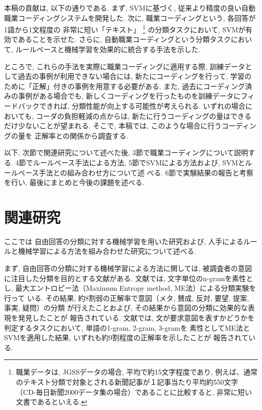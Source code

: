 \documentclass{nlp}
\begin{document}
本稿の貢献は, 以下の通りである. 
まず, 
SVMに基づく, 従来より精度の良い自動職業コーディングシステムを開発した. 
次に, 
職業コーディングという, 
各回答が1語から1文程度の
非常に短い「テキスト」
\footnote{職業データは, JGSSデータの場合, 
平均で約15文字程度であり, 
例えば、通常のテキスト分類で対象とされる新聞記事が１記事当たり平均約550文字
（CD-毎日新聞2000データ集の場合）であることに比較すると, 
非常に短い文書であるといえる. }
の分類タスクにおいて, 
SVMが有効であることを示せた. 
さらに, 
自動職業コーディングという分類タスクにおいて, 
ルールベースと機械学習を効果的に統合する手法を示した. 

ところで, これらの手法を実際に職業コーディングに適用する際, 
訓練データとして過去の事例が利用できない場合には, 
新たにコーディングを行って, 学習のために「正解」付きの事例を用意する必要がある. 
また, 過去にコーディング済みの事例がある場合でも, 
新しくコーディングを行ったものを訓練データにフィードバックできれば, 
分類性能が向上する可能性が考えられる. 
いずれの場合においても, コーダの負担軽減の点からは, 
新たに行うコーディングの量はできるだけ少ないことが望まれる. 
そこで, 本稿では, このような場合に行うコーディングの量を
正解率との関係から調査する. 

以下, 次節で関連研究について述べた後, 
3節で職業コーディングについて説明する. 
4節でルールベース手法による方法, 
5節でSVMによる方法および, SVMとルールベース手法との組み合わせ方について述
べる. 
6節で実験結果の報告と考察を行い, 
最後にまとめと今後の課題を述べる. 

\section{関連研究}
\label{sec:kanren}
ここでは
自由回答の分類に対する機械学習を用いた研究および,  
人手によるルールと機械学習による方法を組み合わせた研究について述べる. 

まず, 自由回答の分類に対する機械学習による方法に関しては,
被調査者の意図に注目した分類を目的とする文献\cite{Inui_et_al03a,Inui_et_al03b}がある. 
文献\cite{Inui_et_al03a}では, 文字単位のn-gramを素性とし, 
最大エントロピー法（Maximum Entropy method, ME法）による分類実験を行って
いる. その結果, 
約8割弱の正解率で意図（メタ, 賛成, 反対, 要望, 提案, 事実, 疑問）の分類
が行えたことおよび, その結果から意図の分類に効果的な表現を発見したことが
報告されている. 
文献\cite{Inui_et_al03b}では, 
文が要求意図を表すかどうかを判定するタスクにおいて, 単語の1-gram, 2-gram, 
3-gramを
素性としてME法とSVMを適用した結果, 
いずれも約9割程度の正解率を示したことが
報告されている. 
\end{document}
